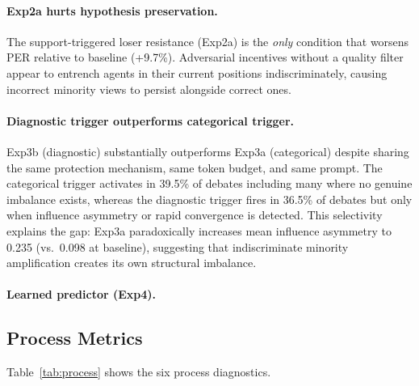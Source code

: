\paragraph{Exp2a hurts hypothesis preservation.}
The support-triggered loser resistance (Exp2a) is the \emph{only} condition
that worsens PER relative to baseline (+9.7\%).
Adversarial incentives without a quality filter appear to entrench agents in
their current positions indiscriminately, causing incorrect minority views to
persist alongside correct ones.

\paragraph{Diagnostic trigger outperforms categorical trigger.}
Exp3b (diagnostic) substantially outperforms Exp3a (categorical) despite
sharing the same protection mechanism, same token budget, and same prompt.
The categorical trigger activates in 39.5\% of debates including many
where no genuine imbalance exists, whereas the diagnostic trigger fires in
36.5\% of debates but only when influence asymmetry or rapid convergence is
detected.
This selectivity explains the gap: Exp3a paradoxically increases mean
influence asymmetry to 0.235 (vs.\ 0.098 at baseline), suggesting that
indiscriminate minority amplification creates its own structural imbalance.

\paragraph{Learned predictor (Exp4).}

\subsection{Process Metrics}

Table~\ref{tab:process} shows the six process diagnostics.

